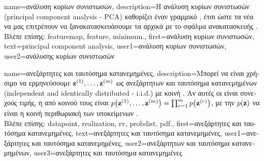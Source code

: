 {name={\foreignlanguage{greek}{ανάλυση κυρίων συνιστωσών}}, 
	description={\foreignlanguage{greek}{Η ανάλυση κυρίων συνιστωσών} 
		(principal component analysis - PCA) \foreignlanguage{greek}{καθορίζει έναν γραμμικό} , \foreignlanguage{greek}{έτσι 
		ώστε τα νέα}  \foreignlanguage{greek}{να μας επιτρέπουν να ξανακατασκευάσουμε τα αρχικά}  
		\foreignlanguage{greek}{με το}  
		\foreignlanguage{greek}{σφάλμα ανακατασκευής} \cite{MLBasics}.\\
		\foreignlanguage{greek}{Βλέπε επίσης:} \gls{featuremap}, \gls{feature}, \gls{minimum}.},
	first={\foreignlanguage{greek}{ανάλυση κυρίων συνιστωσών}},
	text={principal component analysis},
	user1={\foreignlanguage{greek}{ανάλυση κυρίων συνιστωσών}}, %
	user2={\foreignlanguage{greek}{ανάλυσης κυρίων συνιστωσών}} %
}

{name={\foreignlanguage{greek}{ανεξάρτητες και ταυτόσημα κατανεμημένες}}, 
	description={\foreignlanguage{greek}{Μπορεί να είναι χρήσιμο να ερμηνεύσουμε} 
		 ${\bf z}^{(1)}, \ldots, {\bf z}^{(m)}$ \foreignlanguage{greek}{ως}
		 \foreignlanguage{greek}{ανεξάρτητων και ταυτόσημα κατανεμημένων} (independent and identically distributed - i.i.d.) 
		 \foreignlanguage{greek}{με κοινή} . \foreignlanguage{greek}{Αν αυτές οι}  \foreignlanguage{greek}{είναι 
		συνεχούς τιμής, η από κοινού τους}  \foreignlanguage{greek}{είναι  
		$p\big({\bf z}^{(1)}, \ldots, {\bf z}^{(m)} \big) = \prod_{r=1}^{m} p \big({\bf z}^{(r)}\big)$, 
		με την $p({\bf z})$ να είναι η κοινή περιθωριακή}  \foreignlanguage{greek}{των υποκείμενων} .\\
		\foreignlanguage{greek}{Βλέπε επίσης:} \gls{datapoint}, \gls{realization}, \gls{rv}, \gls{probdist}, \gls{pdf}.},
	first={\foreignlanguage{greek}{ανεξάρτητες και ταυτόσημα κατανεμημένες}},
	text={\foreignlanguage{greek}{ανεξάρτητες και ταυτόσημα κατανεμημένες}},
	user1={\foreignlanguage{greek}{ανεξάρτητες και ταυτόσημα κατανεμημένες}}, %
  	user2={\foreignlanguage{greek}{ανεξάρτητων και ταυτόσημα κατανεμημένων}}, %
	user3={\foreignlanguage{greek}{ανεξάρτητες και ταυτόσημα κατανεμημένες}} %
}


